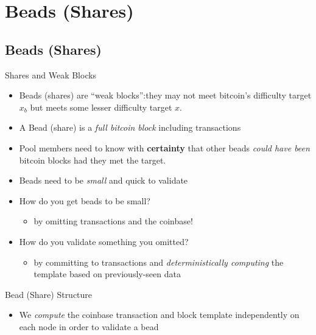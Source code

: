 \documentclass[tikz,mathserif,usenames,dvipsnames,svgnames,table]{beamer}
\newlength{\wideitemsep}
\let\olditem\item
\renewcommand{\item}{\setlength{\itemsep}{\wideitemsep}\olditem}
\begin{document}
\section{Beads (Shares)}
\subsection{Beads (Shares)}
\begin{frame}{Shares and Weak Blocks}
    \begin{itemize}
        \item Beads (shares) are ``weak blocks'':they may not meet bitcoin's difficulty target $x_b$
            but meets some lesser difficulty target $x$.
        \item A Bead (share) is a {\it full bitcoin block} including transactions
        \item Pool members need to know with {\bf certainty} that other beads {\it could have been}
            bitcoin blocks had they met the target.
        \item Beads need to be {\it small} and quick to validate
        \item How do you get beads to be small?
            \begin{itemize}
                \item[$\Rightarrow$] by omitting transactions and the coinbase!
            \end{itemize}
        \item How do you validate something you omitted?
            \begin{itemize}
                \item[$\Rightarrow$] by committing to transactions and {\it deterministically
                    computing} the template based on previously-seen data
            \end{itemize}
    \end{itemize}
\end{frame}
\begin{frame}{Bead (Share) Structure}



\begin{itemize}
    \item We {\it compute} the coinbase transaction and block template independently on each node
        in order to validate a bead
\end{itemize}
\end{frame}
\end{document}
